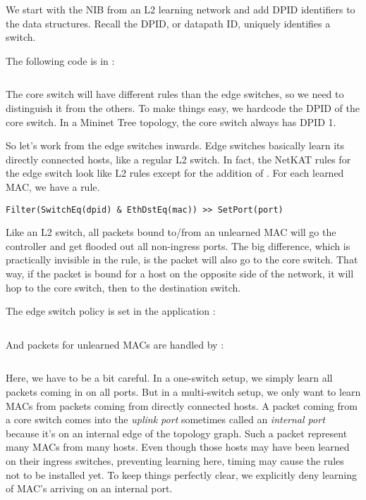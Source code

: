 We start with the NIB from an L2 learning network and add DPID identifiers to the data
structures.  Recall the DPID, or datapath ID, uniquely identifies a switch.

The following code is in  :

\inputminted{python}{code/multiswitch_topologies/network_information_base.py}

The core switch will have different rules than the edge switches, so we need to distinguish it
from the others.  To make things easy, we hardcode the DPID of the core switch.  
In a Mininet Tree topology, the core switch always has DPID 1.  

So let's work from the edge switches inwards.  Edge switches basically learn its directly
connected hosts, like a regular L2 switch.  In fact, the NetKAT rules for the edge switch 
look like L2 rules except for the addition of .  For each learned MAC, we have a rule.

\begin{verbatim}
Filter(SwitchEq(dpid) & EthDstEq(mac)) >> SetPort(port) 
\end{verbatim}

Like an L2 switch, all packets bound to/from an unlearned MAC will go the controller and get flooded
out all non-ingress ports.  The big difference, which is practically invisible in the rule, is
the packet will also go to the core switch.  That way, if the packet is bound for a host on the 
opposite side of the network, it will hop to the core switch, then to the destination switch.  

The edge switch policy is set in the application :

\inputminted[firstline=22,lastline=40]{python}{code/multiswitch_topologies/multiswitch1.py}

And packets for unlearned MACs are handled by :

\inputminted[firstline=54,lastline=78]{python}{code/multiswitch_topologies/multiswitch1.py}

Here, we have to be a bit careful.  In a one-switch setup, we simply learn all packets coming in
on all ports.  But in a multi-switch setup, we only want to learn MACs from packets coming from
directly connected hosts.  A packet coming from a core switch comes into the \emph{uplink port}
sometimes called an \emph{internal port} because it's on an internal edge of the topology
graph.  
Such a packet represent many MACs from many hosts.  Even though those hosts may have been learned on their
ingress switches, preventing learning here, timing may cause the rules not to be installed yet.
To keep things perfectly clear, we explicitly deny learning of MAC's arriving on an internal port.

